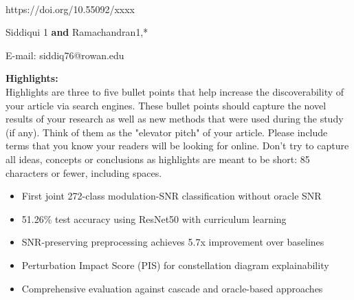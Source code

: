 \documentclass{ELSP}
\begin{document}
\begin{flushleft}
{\sffamily \small {}}\\
{\sffamily\small{https://doi.org/10.55092/xxxx}}


 {Siddiqui} {1}
\textbf{and} 
 {Ramachandran}{1,}{*}


 {E-mail: siddiq76@rowan.edu}
\end{flushleft}
\noindent\textbf{\textcolor[RGB]{0,131,255}{Highlights:}}\\
\newline
Highlights are three to five bullet points that help increase the discoverability of your article via search engines. These bullet points should capture the novel results of your research as well as new methods that were used during the study (if any). Think of them as the "elevator pitch" of your article. Please include terms that you know your readers will be looking for online. Don't try to capture all ideas, concepts or conclusions as highlights are meant to be short: 85 characters or fewer, including spaces.
\begin{itemize}
    \item First joint 272-class modulation-SNR classification without oracle SNR
    \item 51.26\% test accuracy using ResNet50 with curriculum learning
    \item SNR-preserving preprocessing achieves 5.7x improvement over baselines
    \item Perturbation Impact Score (PIS) for constellation diagram explainability
    \item Comprehensive evaluation against cascade and oracle-based approaches
\end{itemize}
\end{document}
